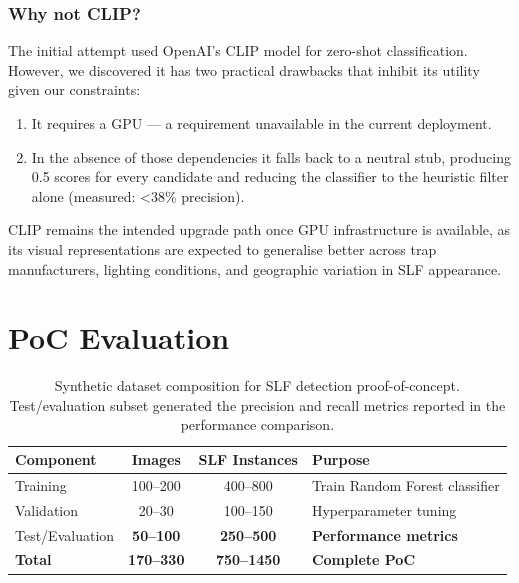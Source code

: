 \documentclass[11pt, a4paper]{article}
\begin{document}
\subsubsection{Why not CLIP?}
The initial attempt used OpenAI's CLIP model for zero-shot classification. However, we discovered it has 
two practical drawbacks that inhibit its utility given our constraints:
\begin{enumerate}
    \item It requires a GPU — a requirement unavailable in the current deployment.
    \item In the absence of those dependencies it falls back to a neutral stub, producing 
        0.5 scores for every candidate and reducing the classifier to the heuristic filter 
        alone (measured: <38\% precision).
\end{enumerate}

CLIP remains the intended upgrade path once GPU infrastructure is available, as its visual representations are expected to generalise 
better across trap manufacturers, lighting conditions, and geographic variation in SLF appearance.


\section{PoC Evaluation}

\begin{table}[htbp]
\centering
\begin{tabular}{lccp{3cm}}
\toprule
\textbf{Component} & \textbf{Images} & \textbf{SLF Instances} & \textbf{Purpose} \\
\midrule
Training & 100--200 & 400--800 & Train Random Forest classifier \\
Validation & 20--30 & 100--150 & Hyperparameter tuning \\
Test/Evaluation & \textbf{50--100} & \textbf{250--500} & \textbf{Performance metrics} \\
\midrule
\textbf{Total} & \textbf{170--330} & \textbf{750--1450} & \textbf{Complete PoC} \\
\bottomrule
\end{tabular}
\caption{Synthetic dataset composition for SLF detection proof-of-concept. Test/evaluation subset generated the precision and recall metrics reported in the performance comparison.}
\label{tab:synthetic_data_composition}
\end{table}
\end{document}
